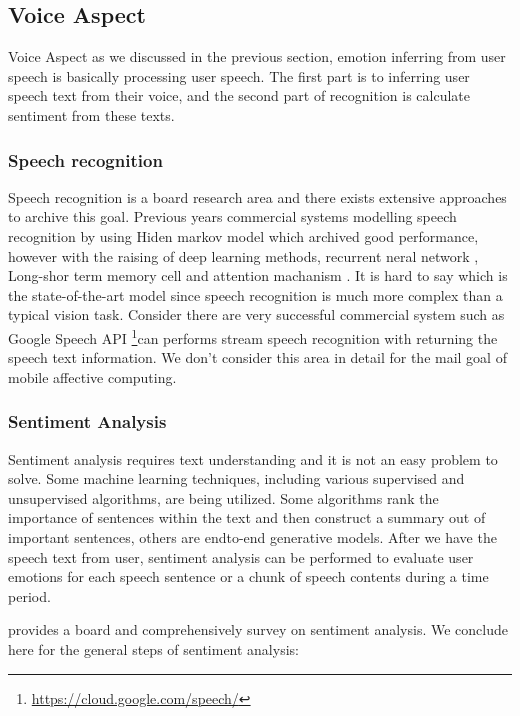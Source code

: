 \subsection{Voice Aspect}\label{subsec:voice-model}

Voice Aspect as we discussed in the previous section, emotion inferring from user speech is basically processing user speech. The first part is to inferring user speech text from their voice, and the second part of recognition is calculate sentiment from these texts.

\subsubsection{Speech recognition}

Speech recognition is a board research area and there exists extensive approaches to archive this goal. Previous years commercial systems modelling speech recognition by using Hiden markov model which archived good performance, however with the raising of deep learning methods, recurrent neral network \cite{mikolov2010recurrent}, Long-shor term memory cell \cite{hochreiter1997long} and attention machanism \cite{google2017}. It is hard to say which is the state-of-the-art model since speech recognition is much more complex than a typical vision task. Consider there are very successful commercial system such as Google Speech API \footnote{\url{https://cloud.google.com/speech/}}can performs stream speech recognition with returning the speech text information. We don't consider this area in detail for the mail goal of mobile affective computing.

\subsubsection{Sentiment Analysis}

Sentiment analysis requires text understanding and it is not an easy problem to
solve. Some machine learning techniques, including various supervised and unsupervised algorithms, are being utilized. Some algorithms rank the importance of sentences within the text and then construct a summary out of important sentences, others are endto-end generative models. After we have the speech text from user, sentiment analysis can be performed to evaluate user emotions for each speech sentence or a chunk of speech contents during a time period.

\cite{Rajalakshmi2017ACS} provides a board and comprehensively survey on sentiment analysis. We conclude here for the general steps of sentiment analysis:

